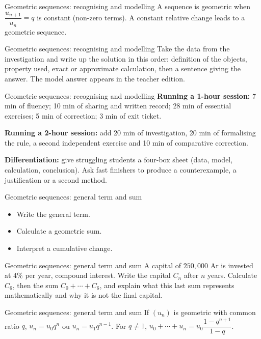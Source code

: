 \documentclass[aspectratio=169,10pt]{beamer}
\begin{document}
\begin{frame}{Geometric sequences: recognising and modelling}
A sequence is geometric when \(\dfrac{u_{n+1}}{u_n}=q\) is constant (non-zero terms). A constant relative change leads to a geometric sequence.
\end{frame}
\begin{frame}{Geometric sequences: recognising and modelling}
Take the data from the investigation and write up the solution in this order: definition of the objects, property used, exact or approximate calculation, then a sentence giving the answer. The model answer appears in the teacher edition.
\end{frame}
\begin{frame}{Geometric sequences: recognising and modelling}
\textbf{Running a 1-hour session:} 7 min of fluency; 10 min of sharing and written record; 28 min of essential exercises; 5 min of correction; 3 min of exit ticket.

\textbf{Running a 2-hour session:} add 20 min of investigation, 20 min of formalising the rule, a second independent exercise and 10 min of comparative correction.

\textbf{Differentiation:} give struggling students a four-box sheet (data, model, calculation, conclusion). Ask fast finishers to produce a counterexample, a justification or a second method.
\end{frame}
\begin{frame}{Geometric sequences: general term and sum}
\begin{itemize}
\item Write the general term.
\item Calculate a geometric sum.
\item Interpret a cumulative change.

\end{itemize}
\end{frame}
\begin{frame}{Geometric sequences: general term and sum}
A capital of \(250{,}000\) Ar is invested at \(4\%\) per year, compound interest. Write the capital \(C_n\) after \(n\) years. Calculate \(C_6\), then the sum \(C_0+\cdots+C_6\), and explain what this last sum represents mathematically and why it is not the final capital.
\end{frame}
\begin{frame}{Geometric sequences: general term and sum}
If \((u_n)\) is geometric with common ratio \(q\), \(u_n=u_0q^n\) ou \(u_n=u_1q^{n-1}\). For \(q\neq1\), \(u_0+\cdots+u_n=u_0\dfrac{1-q^{n+1}}{1-q}\).
\end{frame}
\end{document}
